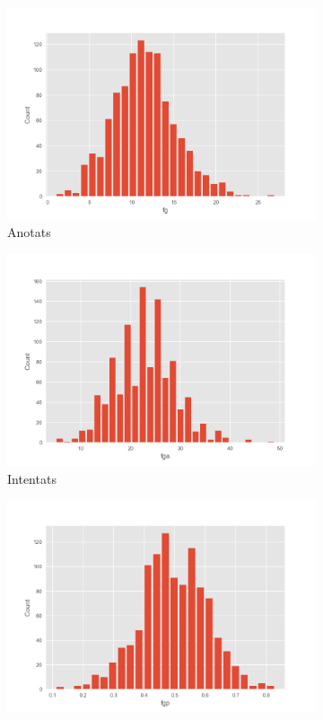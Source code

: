 \documentclass{article}
\begin{document}
\begin{figure}[!h]
	\centering
	\begin{subfigure}[b]{0.25\textwidth}
		\centering
		\includegraphics[width=\textwidth]{hist7}
		\caption*{Anotats}
		\label{fig:hist7}
	\end{subfigure}
	\hfill
	\begin{subfigure}[b]{0.25\textwidth}
		\centering
		\includegraphics[width=\textwidth]{hist8}
		\caption*{Intentats}
		\label{fig:hist8}
	\end{subfigure}
	\hfill
	\begin{subfigure}[b]{0.25\textwidth}
		\centering
		\includegraphics[width=\textwidth]{hist9}

\end{subfigure}
\end{figure}
\end{document}
